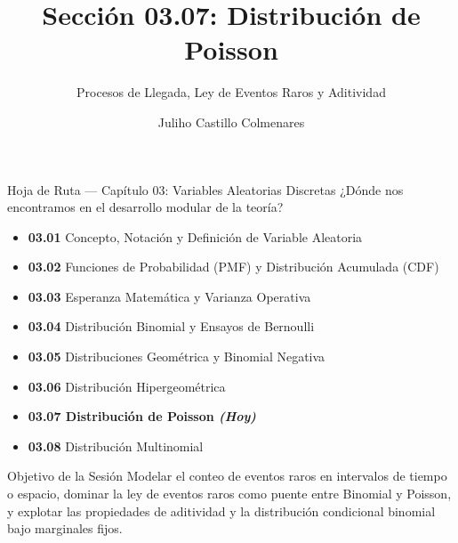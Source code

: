 \documentclass[10pt, aspectratio=169]{beamer}
\title[Distribución de Poisson]{Sección 03.07: Distribución de Poisson}
\subtitle{Procesos de Llegada, Ley de Eventos Raros y Aditividad}
\author[J. Castillo Colmenares]{Juliho Castillo Colmenares}
\institute{Tecnológico de Monterrey}
\date{\vspace{-1.2cm}}
\begin{document}
\begin{frame}[plain]
  \vspace{-0.8cm}
  \titlepage
\end{frame}

\begin{frame}{Hoja de Ruta --- Capítulo 03: Variables Aleatorias Discretas}
  \footnotesize
  ¿Dónde nos encontramos en el desarrollo modular de la teoría? \pause
  \begin{itemize}\itemsep=0.08em
    \item \textbf{03.01} Concepto, Notación y Definición de Variable Aleatoria \pause
    \item \textbf{03.02} Funciones de Probabilidad (PMF) y Distribución Acumulada (CDF) \pause
    \item \textbf{03.03} Esperanza Matemática y Varianza Operativa \pause
    \item \textbf{03.04} Distribución Binomial y Ensayos de Bernoulli \pause
    \item \textbf{03.05} Distribuciones Geométrica y Binomial Negativa \pause
    \item \textbf{03.06} Distribución Hipergeométrica \pause
    \item \color{TecRojo}\textbf{03.07 Distribución de Poisson \emph{(Hoy)}}\color{black} \pause
    \item \textbf{03.08} Distribución Multinomial
  \end{itemize}
  \vspace{-0.1cm}
  \begin{block}{Objetivo de la Sesión}
    Modelar el conteo de eventos raros en intervalos de tiempo o espacio, dominar la ley de eventos raros como puente entre Binomial y Poisson, y explotar las propiedades de aditividad y la distribución condicional binomial bajo marginales fijos.
  \end{block}
\end{frame}
\end{document}
